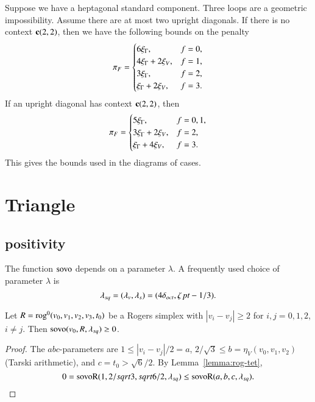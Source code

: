 Suppose we have a heptagonal standard component.  Three loops are a
geometric impossibility. Assume there are at most two upright
diagonals.
 If there is no context ${\operatorname{\bf c}}{(2,2)}$,
 then we have the following bounds on the penalty
    $$
    {\pi_F} = \begin{cases} 6\xi_\Gamma, & f=0,\\
                 4\xi_\Gamma+2\xi_V, & f=1,\\
                3\xi_\Gamma, & f=2,\\
                \xi_\Gamma+2\xi_V, & f=3.
            \end{cases}
    $$
If an upright diagonal has context ${\operatorname{\bf c}}{(2,2)}$, then
    $$
    {\pi_F} = \begin{cases} 5\xi_\Gamma, & f=0,1,\\
                3\xi_\Gamma + 2\xi_V, & f=2,\\
                \xi_\Gamma + 4 \xi_V, &f = 3.\\
            \end{cases}
    $$
This gives the bounds used in the diagrams of cases.








\section{Triangle}


\subsection{positivity}%
    \label{sec:pos}

The function ${\operatorname{sovo}}$ depends on a parameter $\lambda$.
A frequently used choice of parameter $\lambda$ is
$$
 \lambda_{sq} =(\lambda_v,\lambda_s)=(4\delta_{oct},\zeta\,\hbox{\it pt}-1/3).
$$


\begin{lemma}\label{lemma:rog-squ0}
Let $R={\operatorname{rog}}^0(v_0,v_1,v_2,v_3,t_0)$ be a Rogers simplex
with $|v_i-v_j|\ge 2$ for $i,j=0,1,2$, $i\ne j$.
Then ${\operatorname{sovo}}(v_0,R,\lambda_{sq})\ge 0$.
\end{lemma}

\begin{proof}
The $abc$-parameters are $1 \le |v_i-v_j|/2 = a$,
$2/\sqrt{3}\le b = \eta_V(v_0,v_1,v_2)$ (Tarski arithmetic),
and $c = t_0 > \sqrt6/2$.  By Lemma~\ref{lemma:rog-tet},
$$
0 = {\operatorname{sovoR}}(1,2/sqrt{3},sqrt{6}/2,\lambda_{sq}) 
   \le {\operatorname{sovoR}}(a,b,c,\lambda_{sq}).
$$
\end{proof}



